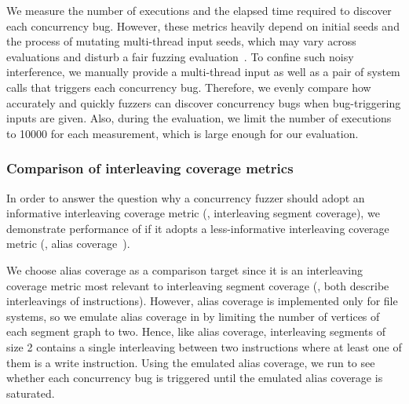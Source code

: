 %
We measure the number of executions and the elapsed time required to
discover each concurrency bug.
%
However, these metrics heavily depend on initial seeds and the process
of mutating multi-thread input seeds, which may vary across evaluations and 
disturb a fair fuzzing evaluation~\cite{fuzzingeval}.
%
To confine such noisy interference, we manually provide
a multi-thread input as well as a pair of system calls that triggers
each concurrency bug.
Therefore, we evenly compare how accurately and quickly fuzzers can discover 
concurrency bugs when bug-triggering inputs are given.
%
%
%
Also, during the evaluation, we limit the number of executions to
10000 for each measurement, which is large enough for our evaluation.
%





\subsubsection{Comparison of interleaving coverage metrics}
\label{sss:interleavingcoverage}
%
In order to answer the question why a concurrency fuzzer should adopt an
informative interleaving coverage metric (\ie, interleaving segment
coverage), we demonstrate performance of \sys if it adopts a
less-informative interleaving coverage metric (\eg, alias
coverage~\cite{krace}).


%
We choose alias coverage as a comparison target since it is an
interleaving coverage metric most relevant to interleaving segment
coverage (\ie, both describe interleavings of instructions).
%
However, alias coverage is implemented only for file systems, so we
emulate alias coverage in \sys by limiting the number of vertices of
each segment graph to two. Hence, like alias coverage,
interleaving segments of size 2 contains a single interleaving 
between two instructions where at least one of them is a write instruction.
%
Using the emulated alias coverage, we run \sys to see whether each
concurrency bug is triggered until the emulated alias coverage is
saturated.


